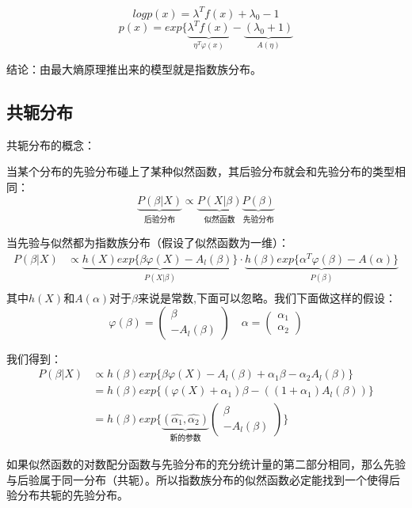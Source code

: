 \documentclass[UTF8]{ctexart} %
\begin{document}
			\[logp(x) = \lambda^Tf(x)+\lambda_0-1\]
			\[p(x) = exp\{\underbrace{\lambda^Tf(x)}_{\eta^T\varphi(x)}-\underbrace{(\lambda_0+1)}_{A(\eta)}\]
			
			结论：由最大熵原理推出来的模型就是指数族分布。
		\subsection{共轭分布}
			共轭分布的概念：
				
			当某个分布的先验分布碰上了某种似然函数，其后验分布就会和先验分布的类型相同：
			\[\underbrace{P(\beta|X)}_{\text{后验分布}} \propto \underbrace{P(X|\beta)}_{\text{似然函数}}\underbrace{ P(\beta)}_{\text{先验分布}}\]
			
			当先验与似然都为指数族分布（假设了似然函数为一维）：
			\[\begin{aligned}
			P(\beta|X) &\propto \underbrace{h(X)exp\{\beta\varphi(X) - A_l(\beta)\}}_{P(X|\beta)} \cdot \underbrace{h(\beta)exp\{\alpha^T\varphi(\beta) - A(\alpha)\}}_{P(\beta)}\\
			\end{aligned}
			\]
			其中$h(X)$和$A(\alpha)$对于$\beta$来说是常数,下面可以忽略。我们下面做这样的假设：
			\[\varphi(\beta) = \begin{pmatrix}
			\beta\\
			-A_l(\beta)
			\end{pmatrix}\quad
			\alpha = \begin{pmatrix}
			\alpha_1\\
			\alpha_2
			\end{pmatrix}\]
			
			我们得到：
			\[\begin{aligned}
			P(\beta|X) &\propto h(\beta)  exp\{\beta\varphi(X) - A_l(\beta) +\alpha_1\beta -\alpha_2A_l(\beta)  \}\\
			&=h(\beta) exp\{(\varphi(X)+\alpha_1)\beta - ((1+\alpha_1)A_l(\beta))\}\\
			&=h(\beta) exp\{\underbrace{(\hat{\alpha_1},\hat{\alpha_2})}_{\text{新的参数}}\begin{pmatrix}
			\beta\\
			-A_l(\beta)
			\end{pmatrix}\}
			\end{aligned}
			\]
			
			如果似然函数的对数配分函数与先验分布的充分统计量的第二部分相同，那么先验与后验属于同一分布（共轭）。所以指数族分布的似然函数必定能找到一个使得后验分布共轭的先验分布。
			
			
			
\end{document}
